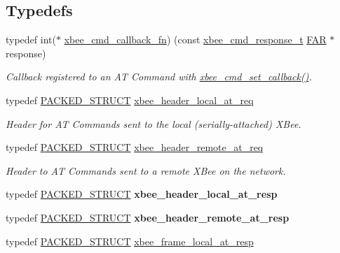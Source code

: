 \subsection*{Typedefs}
\begin{DoxyCompactItemize}
\item 
typedef int($\ast$ \hyperlink{group__xbee__atcmd_ga113cbd0a40a638710974218de5f885fe}{xbee\+\_\+cmd\+\_\+callback\+\_\+fn}) (const \hyperlink{structxbee__cmd__response__t}{xbee\+\_\+cmd\+\_\+response\+\_\+t} \hyperlink{group__hal_gaef060b3456fdcc093a7210a762d5f2ed}{F\+AR} $\ast$response)
\begin{DoxyCompactList}\small\item\em Callback registered to an AT Command with \hyperlink{group__xbee__atcmd_ga0a5d2e2e87743061c46abd53e379e014}{xbee\+\_\+cmd\+\_\+set\+\_\+callback()}. \end{DoxyCompactList}\item 
typedef \hyperlink{group___s_x_a_ga4233297bd31be5c273d4fb0758cc54d7}{P\+A\+C\+K\+E\+D\+\_\+\+S\+T\+R\+U\+CT} \hyperlink{group__xbee__atcmd_ga9bf03869fc9022aadb223bfe0cbbce48}{xbee\+\_\+header\+\_\+local\+\_\+at\+\_\+req}
\begin{DoxyCompactList}\small\item\em Header for AT Commands sent to the local (serially-\/attached) X\+Bee. \end{DoxyCompactList}\item 
typedef \hyperlink{group___s_x_a_ga4233297bd31be5c273d4fb0758cc54d7}{P\+A\+C\+K\+E\+D\+\_\+\+S\+T\+R\+U\+CT} \hyperlink{group__xbee__atcmd_gad9afb37256d642019ad00c6ec75eae05}{xbee\+\_\+header\+\_\+remote\+\_\+at\+\_\+req}
\begin{DoxyCompactList}\small\item\em Header to AT Commands sent to a remote X\+Bee on the network. \end{DoxyCompactList}\item 
typedef \hyperlink{group___s_x_a_ga4233297bd31be5c273d4fb0758cc54d7}{P\+A\+C\+K\+E\+D\+\_\+\+S\+T\+R\+U\+CT} {\bfseries xbee\+\_\+header\+\_\+local\+\_\+at\+\_\+resp}
\item 
typedef \hyperlink{group___s_x_a_ga4233297bd31be5c273d4fb0758cc54d7}{P\+A\+C\+K\+E\+D\+\_\+\+S\+T\+R\+U\+CT} {\bfseries xbee\+\_\+header\+\_\+remote\+\_\+at\+\_\+resp}
\item 
typedef \hyperlink{group___s_x_a_ga4233297bd31be5c273d4fb0758cc54d7}{P\+A\+C\+K\+E\+D\+\_\+\+S\+T\+R\+U\+CT} \hyperlink{group__xbee__atcmd_ga8e4eb20c6debd4dfac4a8a81d9314e98}{xbee\+\_\+frame\+\_\+local\+\_\+at\+\_\+resp}

\end{DoxyCompactItemize}
